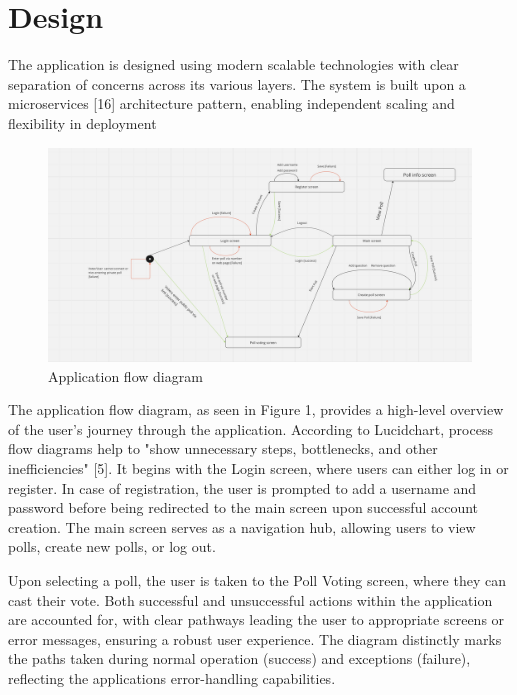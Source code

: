 \section{Design}
\label{sec:design}

The application is designed using modern scalable technologies with clear separation of concerns across its various layers. 
The system is built upon a microservices [16] architecture pattern, enabling independent scaling and flexibility in deployment


\begin{figure}[!htbp]
\centering
\includegraphics[width=\linewidth]{figs/ApplicationFlowDiagram.png}
\caption{Application flow diagram}
\label{fig:appflow}
\end{figure}

The application flow diagram, as seen in Figure 1, provides a high-level overview of the user's journey through the application. According to Lucidchart, process flow diagrams help to "show unnecessary steps, bottlenecks, and other inefficiencies" [5]. It begins with the Login screen, where users can either log in or register. In case of registration, the user is prompted to add a username and password before being redirected to the main screen upon successful account creation. The main screen serves as a navigation hub, allowing users to view polls, create new polls, or log out.

Upon selecting a poll, the user is taken to the Poll Voting screen, where they can cast their vote. Both successful and unsuccessful actions within the application are accounted for, with clear pathways leading the user to appropriate screens or error messages, ensuring a robust user experience. The diagram distinctly marks the paths taken during normal operation (success) and exceptions (failure), reflecting the applications error-handling capabilities.

